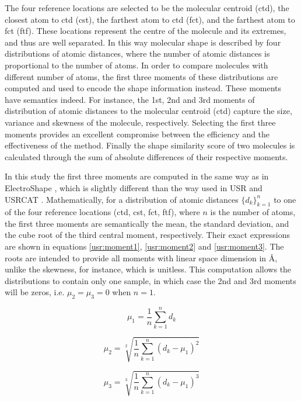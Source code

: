 The four reference locations are selected to be the molecular centroid (ctd), the closest atom to ctd (cst), the farthest atom to ctd (fct), and the farthest atom to fct (ftf). These locations represent the centre of the molecule and its extremes, and thus are well separated. In this way molecular shape is described by four distributions of atomic distances, where the number of atomic distances is proportional to the number of atoms. In order to compare molecules with different number of atoms, the first three moments of these distributions are computed and used to encode the shape information instead. These moments have semantics indeed. For instance, the 1st, 2nd and 3rd moments of distribution of atomic distances to the molecular centroid (ctd) capture the size, variance and skewness of the molecule, respectively. Selecting the first three moments provides an excellent compromise between the efficiency and the effectiveness of the method. Finally the shape similarity score of two molecules is calculated through the sum of absolute differences of their respective moments.

In this study the first three moments are computed in the same way as in ElectroShape \citep{1337}, which is slightly different than the way used in USR \citep{1379,1332,1380} and USRCAT \citep{1331}. Mathematically, for a distribution of atomic distances $\{d_k\}_{k=1}^n$ to one of the four reference locations (ctd, cst, fct, ftf), where $n$ is the number of atoms, the first three moments are semantically the mean, the standard deviation, and the cube root of the third central moment, respectively. Their exact expressions are shown in equations \eqref{usr:moment1}, \eqref{usr:moment2} and \eqref{usr:moment3}. The roots are intended to provide all moments with linear space dimension in \AA, unlike the skewness, for instance, which is unitless. This computation allows the distributions to contain only one sample, in which case the 2nd and 3rd moments will be zeros, i.e. $\mu_2=\mu_3=0$ when $n=1$.

\begin{equation}
\mu_1=\frac{1}{n}\sum_{k=1}^{n}{d_k}
\label{usr:moment1}
\end{equation}

\begin{equation}
\mu_2=\sqrt[2]{\frac{1}{n}\sum_{k=1}^{n}{(d_k-\mu_1)^2}}
\label{usr:moment2}
\end{equation}

\begin{equation}
\mu_3=\sqrt[3]{\frac{1}{n}\sum_{k=1}^{n}{(d_k-\mu_1)^3}}
\label{usr:moment3}
\end{equation}

